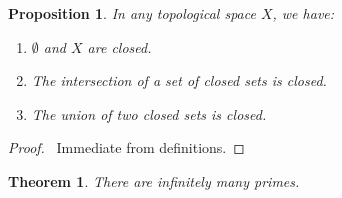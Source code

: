 \documentclass{book}
\let\qed\relax
\newtheorem{prop}[ax]{Proposition}
\newtheorem{thm}[ax]{Theorem}
\theoremstyle{definition}
\begin{document}
\begin{prop}
In any topological space $X$, we have:
\begin{enumerate}
\item $\emptyset$ and $X$ are closed.
\item The intersection of a set of closed sets is closed.
\item The union of two closed sets is closed.
\end{enumerate}
\end{prop}

\begin{proof}
\pf\ Immediate from definitions. \qed
\end{proof}

\begin{thm}
There are infinitely many primes.
\end{thm}
\end{document}
